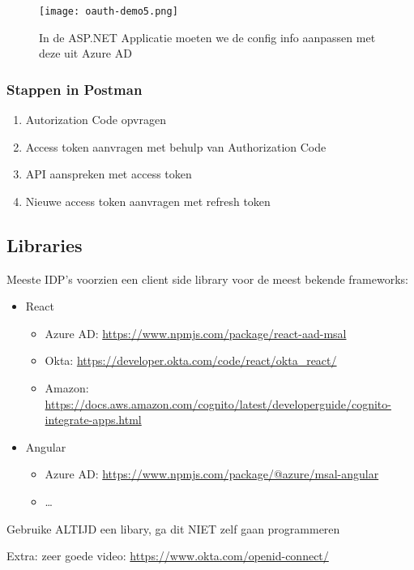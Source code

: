 \documentclass{article}
\begin{document}
\begin{figure}[H]
    \centering
    \texttt{[image: oauth-demo5.png]}
    \caption{In de ASP.NET Applicatie moeten we de config info aanpassen met deze uit Azure AD}
\end{figure}

\subsubsection{Stappen in Postman}

\begin{enumerate}
    \item Autorization Code opvragen
    \item Access token aanvragen met behulp van Authorization Code
    \item API aanspreken met access token
    \item Nieuwe access token aanvragen met refresh token
\end{enumerate}

\subsection{Libraries}

Meeste IDP’s voorzien een client side library voor de meest bekende frameworks:

\begin{itemize}
    \item React
    \begin{itemize}
        \item Azure AD: \url{https://www.npmjs.com/package/react-aad-msal}
        \item Okta: \url{https://developer.okta.com/code/react/okta_react/}
        \item Amazon: \url{https://docs.aws.amazon.com/cognito/latest/developerguide/cognito-integrate-apps.html}
    \end{itemize}
    \item Angular
    \begin{itemize}
        \item Azure AD: \url{https://www.npmjs.com/package/@azure/msal-angular}
        \item \dots
    \end{itemize}
\end{itemize}

Gebruike ALTIJD een libary, ga dit NIET zelf gaan programmeren

Extra: zeer goede video: \url{https://www.okta.com/openid-connect/}
\end{document}
